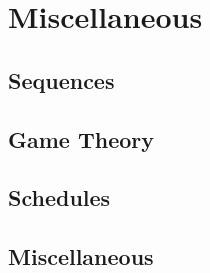 \documentclass[11pt,a4paper,oneside]{book}
\let\Oldpart\part
\newcommand\parttitle{}
\renewcommand\part[1]{\Oldpart{#1}\thispagestyle{empty}\renewcommand{\parttitle}{#1}}
\begin{document}
\part{Miscellaneous}
\chapter{Sequences}




\chapter{Game Theory}


\chapter{Schedules}



\chapter{Miscellaneous}




\end{document}
